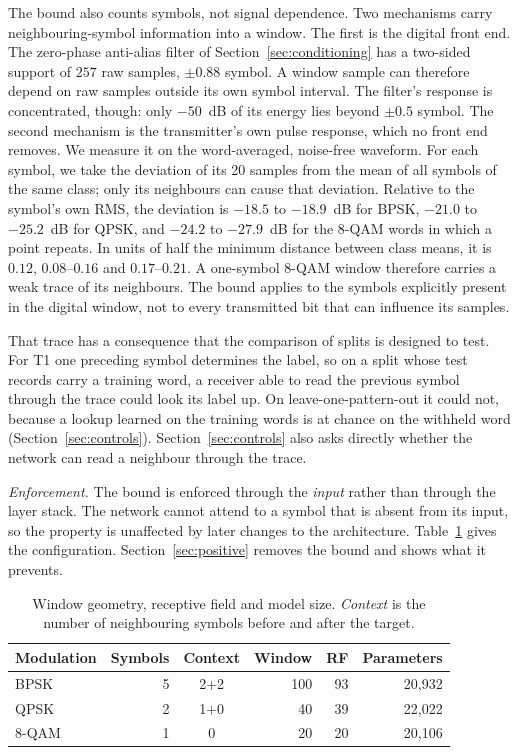 \documentclass{ieeeaccess}
\begin{document}
The bound also counts symbols, not signal dependence. Two mechanisms carry
neighbouring-symbol information into a window. The first is the digital front
end. The zero-phase anti-alias filter of Section~\ref{sec:conditioning} has a
two-sided support of $257$ raw samples, $\pm 0.88$ symbol. A window sample can
therefore depend on raw samples outside its own symbol interval. The filter's
response is concentrated, though: only $-50$~dB of its energy lies beyond
$\pm 0.5$ symbol. The second mechanism is the transmitter's own pulse response,
which no front end removes. We measure it on the word-averaged, noise-free
waveform. For each symbol, we take the deviation of its 20 samples from the
mean of all symbols of the same class; only its neighbours can cause that
deviation. Relative to the symbol's own RMS, the deviation is $-18.5$ to
$-18.9$~dB for BPSK, $-21.0$ to $-25.2$~dB for QPSK, and $-24.2$ to $-27.9$~dB
for the 8-QAM words in which a point repeats. In units of half the minimum distance between class means, it
is $0.12$, $0.08$--$0.16$ and $0.17$--$0.21$. A one-symbol 8-QAM window
therefore carries a weak trace of its neighbours. The bound applies to the
symbols explicitly present in the digital window, not to every transmitted bit
that can influence its samples.

That trace has a consequence that the comparison of splits is designed to
test. For T1 one preceding symbol determines the label, so on a split whose
test records carry a training word, a receiver able to read the previous symbol
through the trace could look its label up. On leave-one-pattern-out it could
not, because a lookup learned on the training words is at chance on the
withheld word (Section~\ref{sec:controls}). Section~\ref{sec:controls} also
asks directly whether the network can read a neighbour through the trace.

\emph{Enforcement.} The bound is enforced through the \emph{input} rather than
through the layer stack. The network cannot attend to a symbol that is absent
from its input, so the property is unaffected by later changes to the
architecture. Table~\ref{tab:bound} gives the configuration.
Section~\ref{sec:positive} removes the bound and shows what it prevents.

\begin{table}[!t]
\caption{Window geometry, receptive field and model size. \emph{Context} is the
number of neighbouring symbols before and after the target.}
\label{tab:bound}
\centering
\begin{tabular}{lrcrrr}
\toprule
Modulation & Symbols & Context & Window & RF & Parameters \\
\midrule
BPSK  & 5 & 2+2 & 100 & 93 & 20{,}932 \\
QPSK  & 2 & 1+0 &  40 & 39 & 22{,}022 \\
8-QAM & 1 & 0   &  20 & 20 & 20{,}106 \\
\bottomrule
\end{tabular}
\end{table}
\end{document}
